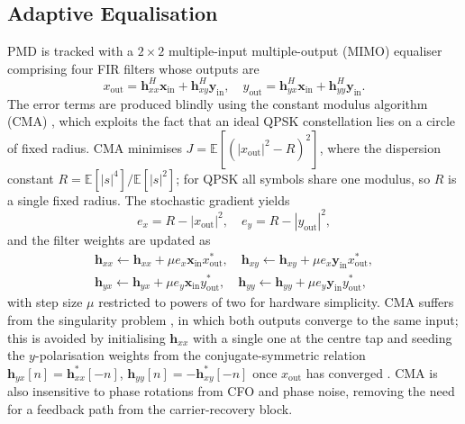 \documentclass[12pt,a4paper]{report}
\begin{document}
\subsection{Adaptive Equalisation}
PMD is tracked with a $2\times 2$ multiple-input multiple-output (MIMO) equaliser comprising four FIR filters whose outputs are
\begin{equation}
    x_\mathrm{out} = \mathbf{h}_{xx}^H \mathbf{x}_\mathrm{in} + \mathbf{h}_{xy}^H \mathbf{y}_\mathrm{in}, \quad y_\mathrm{out} = \mathbf{h}_{yx}^H \mathbf{x}_\mathrm{in} + \mathbf{h}_{yy}^H \mathbf{y}_\mathrm{in}.
    \label{eq:adaptive_output}
\end{equation}
The error terms are produced blindly using the constant modulus algorithm (CMA) \cite{coherent_receivers}, which exploits the fact that an ideal QPSK constellation lies on a circle of fixed radius. CMA minimises $J = \mathbb{E}\!\left[\left(|x_\mathrm{out}|^2 - R\right)^2\right]$, where the dispersion constant $R=\mathbb{E}[|s|^4]/\mathbb{E}[|s|^2]$; for QPSK all symbols share one modulus, so $R$ is a single fixed radius. The stochastic gradient yields
\begin{equation}
    e_x = R - |x_\mathrm{out}|^2, \quad e_y = R - |y_\mathrm{out}|^2,
    \label{eq:cma_error}
\end{equation}
and the filter weights are updated as
\begin{equation}
    \begin{aligned}
    \mathbf{h}_{xx}\leftarrow \mathbf{h}_{xx} + \mu e_x \mathbf{x}_\mathrm{in}x_\mathrm{out}^*, \quad \mathbf{h}_{xy}\leftarrow \mathbf{h}_{xy} + \mu e_x \mathbf{y}_\mathrm{in}x_\mathrm{out}^*, \\
    \mathbf{h}_{yx}\leftarrow \mathbf{h}_{yx} + \mu e_y \mathbf{x}_\mathrm{in}y_\mathrm{out}^*, \quad \mathbf{h}_{yy}\leftarrow \mathbf{h}_{yy} + \mu e_y \mathbf{y}_\mathrm{in}y_\mathrm{out}^*,
    \end{aligned}
    \label{eq:adaptive_update}
\end{equation}
with step size $\mu$ restricted to powers of two for hardware simplicity. CMA suffers from the singularity problem \cite{coherent_receivers}, in which both outputs converge to the same input; this is avoided by initialising $\mathbf{h}_{xx}$ with a single one at the centre tap and seeding the $y$-polarisation weights from the conjugate-symmetric relation $\mathbf{h}_{yx}[n] = \mathbf{h}_{xx}^*[-n]$, $\mathbf{h}_{yy}[n] = -\mathbf{h}_{xy}^*[-n]$ once $x_\mathrm{out}$ has converged \cite{Liu;09}. CMA is also insensitive to phase rotations from CFO and phase noise, removing the need for a feedback path from the carrier-recovery block.
\end{document}

